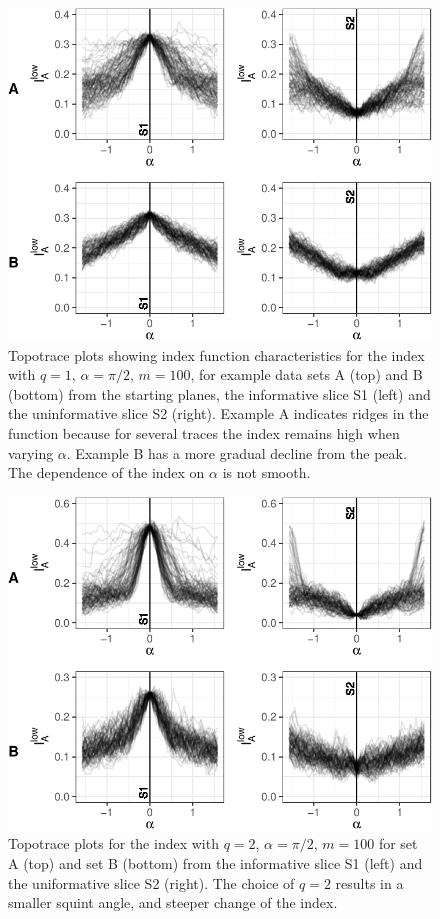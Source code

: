 \documentclass[]{interact}
\theoremstyle{plain}%
\theoremstyle{definition}
\theoremstyle{remark}
\begin{document}
\begin{figure}
\includegraphics[width=1\linewidth]{section_pursuit_files/figure-latex/traces_q1-1} \caption{Topotrace plots showing index function characteristics for the index with $q=1$, $\alpha=\pi/2$, $m=100$, for example data sets A (top) and B (bottom) from the starting planes, the informative slice S1 (left) and the uninformative slice S2 (right). Example A indicates ridges in the function because for several traces the index remains high when varying $\alpha$. Example B has a more gradual decline from the peak. The dependence of the index on $\alpha$ is not smooth.}\label{fig:traces_q1}
\end{figure}

\begin{figure}
\includegraphics[width=1\linewidth]{section_pursuit_files/figure-latex/traces_q2-1} \caption{Topotrace plots for the index with $q=2$, $\alpha = \pi/2$, $m=100$ for set A (top) and set B (bottom) from the informative slice S1 (left) and the uniformative slice S2 (right). The choice of $q=2$ results in a smaller squint angle, and steeper change of the index.}\label{fig:traces_q2}
\end{figure}
\end{document}
